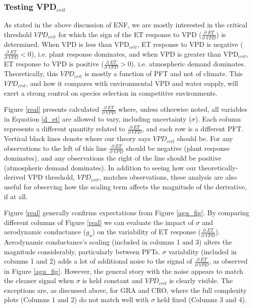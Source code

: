 \documentclass[draft,linenumbers]{gcbjournal}
\begin{document}
\subsubsection{Testing VPD$_{crit}$}
As stated in the above discussion of ENF, we are mostly interested in the critical threshold $VPD_{crit}$ for which the sign of the ET response to VPD ($\frac{\partial \; ET}{\partial \; VPD}$) is determined. When VPD is less than VPD$_{crit}$, ET response to VPD is negative ($\frac{\partial \; ET}{\partial \; VPD}  < 0$), i.e. plant response dominates, and when VPD is greater than VPD$_{crit}$, ET response to VPD is positive  ($\frac{\partial \; ET}{\partial \; VPD} > 0$). i.e. atmospheric demand dominates. Theoretically, this $VPD_{crit}$ is mostly a function of PFT and not of climate. This $VPD_{crit}$, and how it compares with environmental VPD and water supply, will exert a strong control on species selection in competitive environments. 

Figure \ref{real} presents calculated $\frac{\partial \; ET}{\partial \; VPD}$ where, unless otherwise noted, all variables in Equation \ref{d_et} are allowed to vary, including uncertainty ($\sigma$). Each column represents a different quantity related to $\frac{\partial \; ET}{\partial \; VPD}$, and each row is a different PFT. Vertical black lines denote where our theory says $VPD_{crit}$ should be. For any observations to the left of this line $\frac{\partial \; ET}{\partial \; VPD}$ should be negative (plant response dominates), and any observations the right of the line should be positive (atmospheric demand dominates). In addition to seeing how our theoretically-derived VPD threshold, $VPD_{crit}$, matches observations, these analysis are also useful for observing how the scaling term affects the magnitude of the derivative, if at all. 

Figure \ref{real} generally confirms expectations from Figure \ref{agu_fig}. By comparing different columns of Figure \ref{real} we can evaluate the impact of $\sigma$ and aerodynamic conductance ($g_a$) on the variability of ET response ($\frac{\partial \; ET}{\partial \; VPD}$). Aerodynamic conductance's scaling (included in columns 1 and 3) alters the magnitude considerably, particularly between PFTs. $\sigma$ variability (included in columns 1 and 2) adds a lot of additional noise to the signal of $\frac{\partial \; ET}{\partial \; VPD}$, as observed in Figure \ref{agu_fig}. However, the general story with the noise appears to match the cleaner signal when $\sigma$ is held constant and $VPD_{crit}$ is clearly visible. The exceptions are, as discussed above, for GRA and CRO, where the full complexity plots (Columns 1 and 2) do not match well with $\sigma$ held fixed (Columns 3 and 4).
\end{document}
